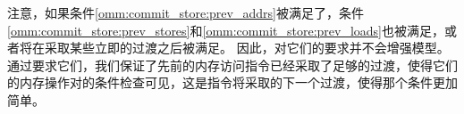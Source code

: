 \begin{commentary}
  注意，如果条件\ref{omm:commit_store:prev_addrs}被满足了，条件\ref{omm:commit_store:prev_stores}和\ref{omm:commit_store:prev_loads}也被满足，或者将在采取某些立即的过渡之后被满足。
  因此，对它们的要求并不会增强模型。通过要求它们，我们保证了先前的内存访问指令已经采取了足够的过渡，使得它们的内存操作对的条件检查可见，这是指令将采取的下一个过渡，使得那个条件更加简单。
\end{commentary}


